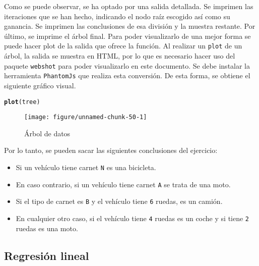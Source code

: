 \documentclass[12pt]{report}\usepackage[]{graphicx}\usepackage[dvipsnames]{xcolor}
\makeatletter
\def\maxwidth{ %
  \ifdim\Gin@nat@width>\linewidth
    \linewidth
  \else
    \Gin@nat@width
  \fi
}
\newcommand{\hlstd}[1]{\textcolor[rgb]{0.345,0.345,0.345}{#1}}%
\newcommand{\hlkwd}[1]{\textcolor[rgb]{0.737,0.353,0.396}{\textbf{#1}}}%
\newenvironment{kframe}{%
 \def\at@end@of@kframe{}%
 \ifinner\ifhmode%
  \def\at@end@of@kframe{\end{minipage}}%
  \begin{minipage}{\columnwidth}%
 \fi\fi%
 \def\FrameCommand##1{\hskip\@totalleftmargin \hskip-\fboxsep
 \colorbox{shadecolor}{##1}\hskip-\fboxsep
     \hskip-\linewidth \hskip-\@totalleftmargin \hskip\columnwidth}%
 \MakeFramed {\advance\hsize-\width
   \@totalleftmargin\z@ \linewidth\hsize
   \@setminipage}}%
 {\par\unskip\endMakeFramed%
 \at@end@of@kframe}
\newenvironment{knitrout}{}{} %
\makeatother
\begin{document}
	 			Como se puede observar, se ha optado por una salida detallada. Se imprimen las iteraciones que se han hecho, indicando el nodo raíz escogido así como su ganancia. Se imprimen las conclusiones de esa división y la muestra restante. Por último, se imprime el árbol final. Para poder visualizarlo de una mejor forma se puede hacer plot de la salida que ofrece la función. Al realizar un \texttt{plot} de un árbol, la salida se muestra en HTML, por lo que es necesario hacer uso del paquete \texttt{webshot} para poder visualizarlo en este documento. Se debe instalar la herramienta \texttt{PhantomJs} que realiza esta conversión. De esta forma, se obtiene el siguiente gráfico visual.
	 			
\begin{knitrout}
\color{fgcolor}\begin{kframe}
\begin{alltt}
\hlkwd{plot}\hlstd{(tree)}
\end{alltt}
\end{kframe}\begin{figure}[H]

{\centering \texttt{[image: figure/unnamed-chunk-50-1]} 

}

\caption[Árbol de datos]{Árbol de datos}\label{fig:unnamed-chunk-50}
\end{figure}

\end{knitrout}
	 			
	 			\noindent Por lo tanto, se pueden sacar las siguientes conclusiones del ejercicio:
	 			
	 			\begin{itemize}
	 				\item Si un vehículo tiene carnet \texttt{N} es una bicicleta.
	 				\item En caso contrario, si un vehículo tiene carnet \texttt{A} se trata de una moto.
	 				\item Si el tipo de carnet es \texttt{B} y el vehículo tiene \texttt{6} ruedas, es un camión.
	 				\item En cualquier otro caso, si el vehículo tiene \texttt{4} ruedas es un coche y si tiene \texttt{2} ruedas es una moto.
	 			\end{itemize}				
 			
 			\subsection{Regresión lineal}
 			
\end{document}
